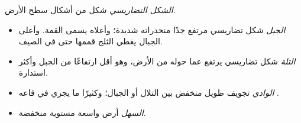 \begin{definition}\label{def:g1:landscapes-around-us:landform}
\emph{الشكل التضاريسي} شكل من أشكال سطح الأرض.
\begin{itemize}
  \item \emph{الجبل} شكل تضاريسي مرتفع جدًا منحدراته شديدة؛
        وأعلاه يسمى القمة. وأعلى الجبال يغطي الثلج قممها حتى في
        الصيف.
  \item \emph{التلة} شكل تضاريسي يرتفع عما حوله من الأرض،
        وهو أقل ارتفاعًا من الجبل وأكثر استدارة.
  \item \emph{الوادي} تجويف طويل منخفض بين التلال أو
        الجبال؛ وكثيرًا ما يجري في قاعه .
  \item \emph{السهل} أرض واسعة مستوية منخفضة.
\end{itemize}
\end{definition}

